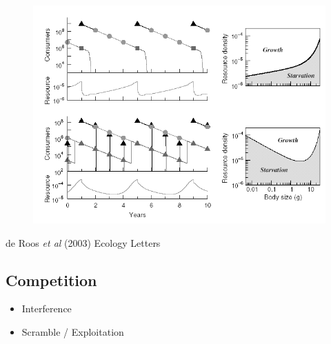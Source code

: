 \documentclass[
  letterpaper,
  DIV=11,
  numbers=noendperiod]{scrartcl}
\begin{document}
\begin{figure}

{\centering \includegraphics{images/cohort_cycles.png}

}

\end{figure}

de Roos \emph{et al} (2003) Ecology Letters

\hypertarget{competition}{%
\subsection{Competition}\label{competition}}

\begin{itemize}
\item
  Interference
\item
  Scramble / Exploitation
\end{itemize}
\end{document}
